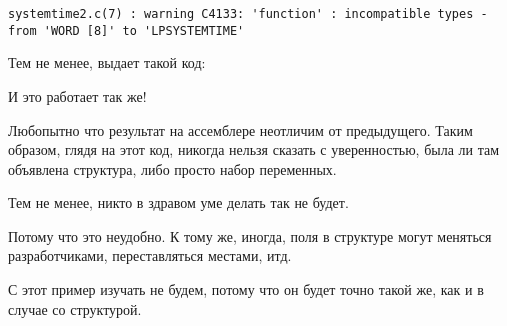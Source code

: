 \begin{lstlisting}
systemtime2.c(7) : warning C4133: 'function' : incompatible types - from 'WORD [8]' to 'LPSYSTEMTIME'
\end{lstlisting}

Тем не менее, выдает такой код:



И это работает так же!

Любопытно что результат на ассемблере неотличим от предыдущего.
Таким образом, глядя на этот код, 
никогда нельзя сказать с уверенностью, была ли там объявлена структура, либо просто набор переменных.

Тем не менее, никто в здравом уме делать так не будет.

Потому что это неудобно. 
К тому же, иногда, поля в структуре могут меняться разработчиками, переставляться местами, итд.

С \olly этот пример изучать не будем, потому что он будет точно такой же, как и в случае со структурой.


